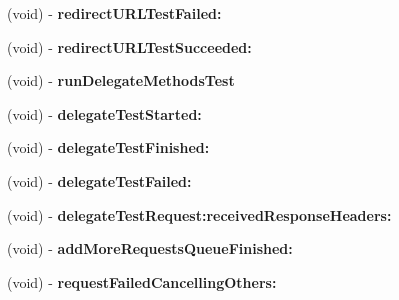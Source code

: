 \begin{DoxyCompactItemize}
\item 
\hypertarget{interface_a_s_i_network_queue_tests_07_08_a31a782738cbfac85a60c92e87dd07972}{
(void) -\/ {\bfseries redirect\-U\-R\-L\-Test\-Failed\-:}}
\label{interface_a_s_i_network_queue_tests_07_08_a31a782738cbfac85a60c92e87dd07972}

\item 
\hypertarget{interface_a_s_i_network_queue_tests_07_08_a02802eb48180e644ceee78ca4840607d}{
(void) -\/ {\bfseries redirect\-U\-R\-L\-Test\-Succeeded\-:}}
\label{interface_a_s_i_network_queue_tests_07_08_a02802eb48180e644ceee78ca4840607d}

\item 
\hypertarget{interface_a_s_i_network_queue_tests_07_08_aac272d1e4ebf8932ab723637f3abe58c}{
(void) -\/ {\bfseries run\-Delegate\-Methods\-Test}}
\label{interface_a_s_i_network_queue_tests_07_08_aac272d1e4ebf8932ab723637f3abe58c}

\item 
\hypertarget{interface_a_s_i_network_queue_tests_07_08_ad63bd013de90e522e12f2bba603c20d7}{
(void) -\/ {\bfseries delegate\-Test\-Started\-:}}
\label{interface_a_s_i_network_queue_tests_07_08_ad63bd013de90e522e12f2bba603c20d7}

\item 
\hypertarget{interface_a_s_i_network_queue_tests_07_08_aa05a6ec84d2a71b363573187e70a6afa}{
(void) -\/ {\bfseries delegate\-Test\-Finished\-:}}
\label{interface_a_s_i_network_queue_tests_07_08_aa05a6ec84d2a71b363573187e70a6afa}

\item 
\hypertarget{interface_a_s_i_network_queue_tests_07_08_a3b74243c00c86e888ffc9cb271138dcb}{
(void) -\/ {\bfseries delegate\-Test\-Failed\-:}}
\label{interface_a_s_i_network_queue_tests_07_08_a3b74243c00c86e888ffc9cb271138dcb}

\item 
\hypertarget{interface_a_s_i_network_queue_tests_07_08_a46a23624618c0547cbcbb9ca82c798cb}{
(void) -\/ {\bfseries delegate\-Test\-Request\-:received\-Response\-Headers\-:}}
\label{interface_a_s_i_network_queue_tests_07_08_a46a23624618c0547cbcbb9ca82c798cb}

\item 
\hypertarget{interface_a_s_i_network_queue_tests_07_08_abe54bb28f6c58b48f2e136adebe7591c}{
(void) -\/ {\bfseries add\-More\-Requests\-Queue\-Finished\-:}}
\label{interface_a_s_i_network_queue_tests_07_08_abe54bb28f6c58b48f2e136adebe7591c}

\item 
\hypertarget{interface_a_s_i_network_queue_tests_07_08_ac13a2a0cfd430c066079f46e968de949}{
(void) -\/ {\bfseries request\-Failed\-Cancelling\-Others\-:}}
\label{interface_a_s_i_network_queue_tests_07_08_ac13a2a0cfd430c066079f46e968de949}


\end{DoxyCompactItemize}
